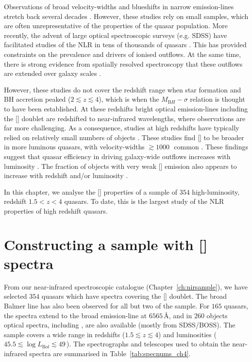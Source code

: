 Observations of broad velocity-widths and blueshifts in narrow emission-lines stretch back several decades \citep[e.g.][]{weedman70,stockton76,heckman81,veron81,feldman82,heckman84,vrtilek85,whittle85,boroson92}. 
However, these studies rely on small samples, which are often unrepresentative of the properties of the quasar population. 
More recently, the advent of large optical spectroscopic surveys (e.g. SDSS) have facilitated studies of the NLR in tens of thousands of quasars \citep[e.g.][]{boroson05,greene05a,zhang11,mullaney13,zakamska14,shen14}. 
This has provided constraints on the prevalence and drivers of ionised outflows.   
At the same time, there is strong evidence from spatially resolved spectroscopy that these outflows are extended over galaxy scales \citep[e.g.][]{greene09,greene11,harrison12,hainline13,harrison14}. 

However, these studies do not cover the redshift range when star formation and BH accretion peaked ($2 \lesssim z \lesssim 4$), which is when the $M_{\mathrm BH}-\sigma$ relation is thought to have been established. 
At these redshifts bright optical emission-lines including the [] doublet are redshifted to near-infrared wavelengths, where observations are far more challenging. 
As a consequence, studies at high redshifts have typically relied on relatively small numbers of objects \citep[e.g.][]{netzer04,sulentic04,shen16a}.
These studies find [] to be broader in more luminous quasars, with velocity-widths $\gtrsim1000$\,\kms\, common \citep[e.g.][]{netzer04,kim13,brusa15,shen16a}.  
These findings suggest that quasar efficiency in driving galaxy-wide outflows increases with luminosity \citep[e.g.][]{netzer04,nesvadba08,kim13,brusa15,carniani15,perna15,bischetti16}. 
The fraction of objects with very weak [] emission also appears to increase with redshift and/or luminosity \citep[e.g.][]{netzer04}. 

In this chapter, we analyse the [] properties of a sample of $354$ high-luminosity, redshift $1.5 < z < 4$ quasars.
To date, this is the largest study of the NLR properties of high redshift quasars. 

\section{Constructing a sample with [] spectra}

From our near-infrared spectroscopic catalogue (Chapter~\ref{ch:nirsample}), we have selected $354$ quasars which have spectra covering the [] doublet. 
The broad Balmer \hb line has also been observed for all but two of the sample. 
For $165$ quasars, the spectra extend to the broad \ha emission-line at $6565$\,\AA, and in $260$ objects optical spectra, including , are also available (mostly from SDSS/BOSS). 
The sample covers a wide range in redshifts ($1.5 \lesssim z \lesssim 4$) and luminosities ($45.5 \lesssim \log L_{\mathrm Bol} \lesssim 49$\,\ergs). 
The spectrographs and telescopes used to obtain the near-infrared spectra are summarised in Table~\ref{tab:specnums_ch4}.

